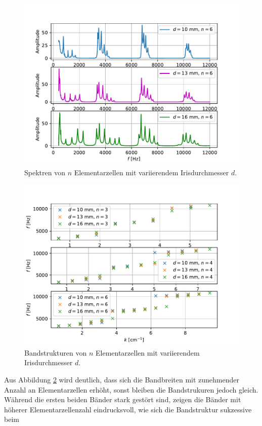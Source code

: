\begin{figure}
  \centering
  \includegraphics[scale=0.5]{Messwerte/plot14.pdf}
  \caption{Spektren von $n$ Elementarzellen mit variierendem Irisdurchmesser $d$.}
  \label{fig:plot14}
\end{figure}
\begin{figure}
  \centering
  \includegraphics[scale=0.5]{Messwerte/plot15.pdf}
  \caption{Bandstrukturen von $n$ Elementarzellen mit variierendem Irisdurchmesser $d$.}
  \label{fig:plot15}
\end{figure}
Aus Abbildung \ref{fig:plot15} wird deutlich, dass sich die Bandbreiten mit zunehmender Anzahl an Elementarzellen erhöht, sonst bleiben die Bandstrukuren jedoch gleich.
Während die ersten beiden Bänder stark gestört sind, zeigen die Bänder mit höherer Elementarzellenzahl eindrucksvoll, wie sich die Bandstruktur sukzessive beim
